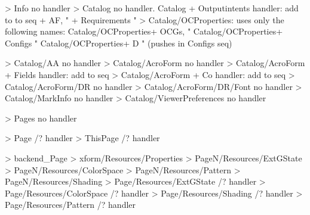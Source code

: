 >  {Info}                                 no handler
>  {Catalog}                              no handler.
   {Catalog}             + Outputintents  handler: add to to seq
                         + AF,             "
                         + Requirements    "
>  {Catalog/OCProperties}: uses only the following names:                         
   {Catalog/OCProperties}+ OCGs,           "   
   {Catalog/OCProperties}+ Configs         "
   {Catalog/OCProperties}+ D               " (pushes in Configs seq)  
    
>  {Catalog/AA}                            no handler
>  {Catalog/AcroForm}                      no handler
>  {Catalog/AcroForm}    + Fields          handler: add to seq
>  {Catalog/AcroForm}    + Co              handler: add to seq
>  {Catalog/AcroForm/DR}                   no handler
>  {Catalog/AcroForm/DR/Font}              no handler
>  {Catalog/MarkInfo}                      no handler
>  {Catalog/ViewerPreferences}             no handler

>  {Pages}                                no handler

>  {Page}                                /? handler
>  {ThisPage}                            /? handler

>  {backend_Page}
>  {xform/Resources/Properties}
>  {PageN/Resources/ExtGState}
>  {PageN/Resources/ColorSpace}
>  {PageN/Resources/Pattern}
>  {PageN/Resources/Shading}
>  {Page/Resources/ExtGState}           /? handler
>  {Page/Resources/ColorSpace}          /? handler
>  {Page/Resources/Shading}             /? handler
>  {Page/Resources/Pattern}             /? handler
